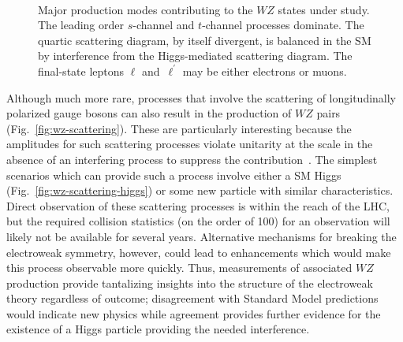 \begin{figure*}[!htbp]
  \centering
  \subbottom[$s$-channel]{
    \label{fig:wz-schannel}
    
  }
  \hspace{0.8in}
  \subbottom[$t$-channel]{
    \label{fig:wz-tchannel}
    
  }\phantom{\hspace{0.2in}}
  \\
  \hspace{0.5in}
  \caption[Diagrams for $WZ$ production]{Major production modes contributing to the $WZ$ states under study.  The leading order $s$-channel and $t$-channel processes dominate.  The quartic scattering diagram, by itself divergent, is balanced in the SM by interference from the Higgs-mediated scattering diagram.  The final-state leptons $\ell$ and~$\ell^{\prime}$ may be either electrons or muons.}
  \label{fig:wz-diagrams}
\end{figure*}

Although much more rare, processes that involve the scattering of longitudinally polarized gauge bosons can also result in the production of $WZ$ pairs (Fig.~\ref{fig:wz-scattering}).  These are particularly interesting because the amplitudes for such scattering processes violate unitarity at the \TeV scale in the absence of an interfering process to suppress the contribution~\cite{Han:2009em}.  The simplest scenarios which can provide such a process involve either a SM Higgs (Fig.~\ref{fig:wz-scattering-higgs}) or some new particle with similar characteristics.  Direct observation of these scattering processes is within the reach of the LHC, but the required collision statistics (on the order of \SI{100}{\fbinv}) for an observation will likely not be available for several years.  Alternative mechanisms for breaking the electroweak symmetry, however, could lead to enhancements which would make this process observable more quickly.  Thus, measurements of associated $WZ$ production provide tantalizing insights into the structure of the electroweak theory regardless of outcome; disagreement with Standard Model predictions would indicate new physics while agreement provides further evidence for the existence of a Higgs particle providing the needed interference.

